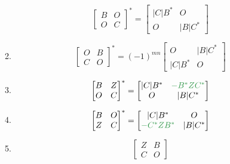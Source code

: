 \documentclass[a4paper,12pt]{article}
\begin{document}
\begin{enumerate}
\begin{enumerate}
\[\begin{bmatrix}
                    B & O \\
                    O & C
                \end{bmatrix}^{*}
                = \begin{bmatrix}
                      |C|B^{*} & O        \\
                      O        & |B|C^{*}
                \end{bmatrix}
            \]
            \item
            \[
                \begin{bmatrix}
                    O & B \\
                    C & O
                \end{bmatrix}^{*}
                = (-1)^{mn}\begin{bmatrix}
                               O        & |B|C^{*} \\
                               |C|B^{*} & O
                \end{bmatrix}
            \]
            \item
            \[
                \begin{bmatrix}
                    B & Z \\
                    O & C
                \end{bmatrix}^{*}
                = \begin{bmatrix}
                      |C|B^{*} & \color[rgb]{0.2, 0.6, 0.3}{-B^{*}ZC^*} \\
                      O        & |B|C^{*}
                \end{bmatrix}
            \]
            \item
            \[
                \begin{bmatrix}
                    B & O \\
                    Z & C
                \end{bmatrix}^{*}
                = \begin{bmatrix}
                      |C|B^{*}                               & O        \\
                      \color[rgb]{0.2, 0.6, 0.3}{-C^{*}ZB^*} & |B|C^{*}
                \end{bmatrix}
            \]
            \item
            \[
                \begin{bmatrix}
                    Z & B \\
                    C & O

\end{bmatrix}\]
\end{enumerate}
\end{enumerate}
\end{document}
